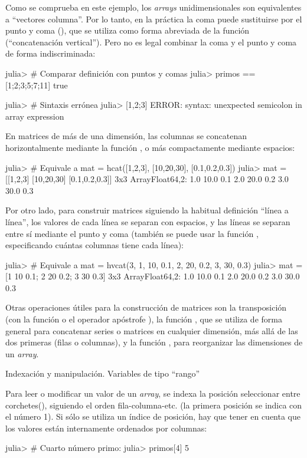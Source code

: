 ﻿\documentclass[spanish]{article}
\begin{document}
Como se comprueba en este ejemplo, los \emph{arrays} unidimensionales son equivalentes a ``vectores columna''. Por lo tanto, en la práctica la coma puede sustituirse por el punto y coma (\codet{;}), que se utiliza como forma abreviada de la función  (``concatenación vertical''). Pero no es legal combinar la coma y el punto y coma de forma indiscriminada:

julia> # Comparar definición con puntos y comas
julia> primos == [1;2;3;5;7;11]
true

julia> # Sintaxis errónea
julia> [1,2;3]
ERROR: syntax: unexpected semicolon in array expression

En matrices de más de una dimensión, las columnas se concatenan horizontalmente mediante la función , o más compactamente mediante espacios:

julia> # Equivale a mat = hcat([1,2,3], [10,20,30], [0.1,0.2,0.3])
julia> mat = [[1,2,3] [10,20,30] [0.1,0.2,0.3]]
3x3 Array{Float64,2}:
 1.0 10.0 0.1
 2.0 20.0 0.2
 3.0 30.0 0.3

Por otro lado, para construir matrices siguiendo la habitual definición ``línea a línea'', los valores de cada línea se separan con espacios, y las líneas se separan entre sí mediante el punto y coma (también se puede usar la función , especificando cuántas columnas tiene cada línea):

julia> # Equivale a mat = hvcat(3, 1, 10, 0.1, 2, 20, 0.2, 3, 30, 0.3)
julia> mat = [1 10 0.1; 2 20 0.2; 3 30 0.3]
3x3 Array{Float64,2}:
 1.0 10.0 0.1
 2.0 20.0 0.2
 3.0 30.0 0.3

Otras operaciones útiles para la construcción de matrices son la transposición (con la función  o el operador apóstrofe ), la función , que se utiliza de forma general para concatenar series o matrices en cualquier dimensión, más allá de las dos primeras (filas o columnas), y la función , para reorganizar las dimensiones de un \emph{array}.

Indexación y manipulación. Variables de tipo ``rango''

Para leer o modificar un valor de un \emph{array}, se indexa la posición seleccionar entre corchetes(\code{[]}), siguiendo el orden fila-columna-etc. (la primera posición se indica con el número 1). Si sólo se utiliza un índice de posición, hay que tener en cuenta que los valores están internamente ordenados por columnas:

julia> # Cuarto número primo:
julia> primos[4]
5
\end{document}
